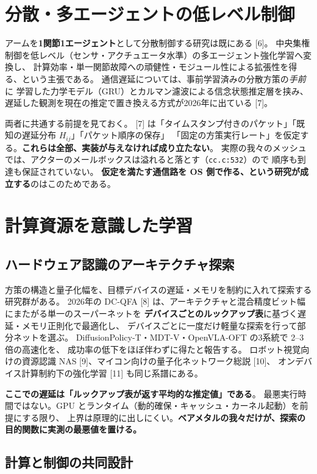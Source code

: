 \documentclass[11pt,a4paper]{article}
\newcommand{\code}[1]{\texttt{#1}}
\newcommand{\prob}[1]{\textbf{\textcolor{red!55!black}{#1}}}
\newcommand{\keyp}[1]{\textbf{\textcolor{blue!45!black}{#1}}}
\begin{document}
\section{分散・多エージェントの低レベル制御}

アームを\keyp{1関節1エージェント}として分散制御する研究は既にある [6]。
中央集権制御を低レベル（センサ・アクチュエータ水準）の多エージェント強化学習へ変換し、
計算効率・単一関節故障への頑健性・モジュール性による拡張性を得る、という主張である。
通信遅延については、事前学習済みの分散方策の\emph{手前}に
学習した力学モデル（GRU）とカルマン濾波による信念状態推定層を挟み、
遅延した観測を現在の推定で置き換える方式が2026年に出ている [7]。

\noindent
両者に共通する前提を見ておく。
[7] は「タイムスタンプ付きのパケット」「既知の遅延分布 $H_{ij}$」「パケット順序の保存」
「固定の方策実行レート」を仮定する。\prob{これらは全部、実装が与えなければ成り立たない}。
実際の我々のメッシュでは、アクターのメールボックスは溢れると落とす（\code{cc.c:532}）ので
順序も到達も保証されていない。
\keyp{仮定を満たす通信路を OS 側で作る、という研究が成立する}のはこのためである。

\section{計算資源を意識した学習}

\subsection{ハードウェア認識のアーキテクチャ探索}

方策の構造と量子化幅を、目標デバイスの遅延・メモリを制約に入れて探索する研究群がある。
2026年の DC-QFA [8] は、アーキテクチャと混合精度ビット幅にまたがる単一のスーパーネットを
\keyp{デバイスごとのルックアップ表}に基づく遅延・メモリ正則化で最適化し、
デバイスごとに一度だけ軽量な探索を行って部分ネットを選ぶ。
DiffusionPolicy-T・MDT-V・OpenVLA-OFT の3系統で 2--3 倍の高速化を、
成功率の低下をほぼ伴わずに得たと報告する。
ロボット視覚向けの資源認識 NAS [9]、マイコン向けの量子化ネットワーク総説 [10]、
オンデバイス計算制約下の強化学習 [11] も同じ系譜にある。

\noindent
\prob{ここでの遅延は「ルックアップ表が返す平均的な推定値」である}。
最悪実行時間ではない。GPU とランタイム（動的確保・キャッシュ・カーネル起動）を前提にする限り、
上界は原理的に出しにくい。\keyp{ベアメタルの我々だけが、探索の目的関数に実測の最悪値を置ける。}

\subsection{計算と制御の共同設計}
\end{document}
